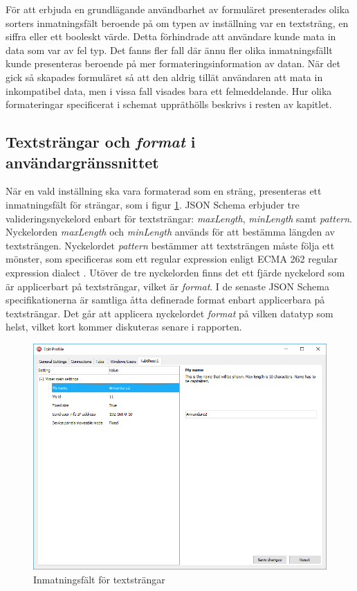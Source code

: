 För att erbjuda en grundlägande användbarhet av formuläret presenterades olika sorters inmatningsfält beroende på om typen av inställning var en textsträng, en siffra eller ett booleskt värde. Detta förhindrade att användare kunde mata in data som var av fel typ. Det fanns fler fall där ännu fler olika inmatningsfällt kunde presenteras beroende på mer formateringsinformation av datan. När det gick så skapades formuläret så att den aldrig tillät användaren att mata in inkompatibel data, men i vissa fall visades bara ett felmeddelande. Hur olika formateringar specificerat i schemat uppräthölls beskrivs i resten av kapitlet.

\subsection{Textsträngar och \textit{format} i användargränssnittet}

När en vald inställning ska vara formaterad som en sträng, presenteras ett inmatningsfält för strängar, som i figur \ref{fig:textstrang}. JSON Schema erbjuder tre valideringsnyckelord enbart för textsträngar: \textit{maxLength}, \textit{minLength} samt \textit{pattern}. Nyckelorden \textit{maxLength} och \textit{minLength} används för att bestämma längden av textsträngen. Nyckelordet \textit{pattern} bestämmer att textsträngen måste följa ett mönster, som specificeras som ett regular expression enligt ECMA 262 regular expression dialect \cite{EcmaInternational2017}. Utöver de tre nyckelorden finns det ett fjärde nyckelord som är applicerbart på textsträngar, vilket är \textit{format}. I de senaste JSON Schema specifikationerna är samtliga åtta definerade format enbart applicerbara på textsträngar. Det går att applicera nyckelordet \textit{format} på vilken datatyp som helst, vilket kort kommer diskuteras senare i rapporten. \cite{Andrews}

\begin{figure}
	\includegraphics[width=\textwidth]{./images/gui/textstrang.png}
	\vspace{-1.7em}
	\caption{Inmatningsfält för textsträngar}
	\label{fig:textstrang}
\end{figure}

